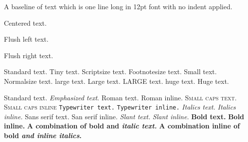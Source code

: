 \usepackage{calc}
\usepackage{longtable}
\usepackage{tabu}
\usepackage{breqn}
\setlength{\arraycolsep}{0.800000em}
\renewcommand{\arraystretch}{1.400000}

\renewcommand{\baselinestretch}{1.250000}
\selectfont
\setlength{\parskip}{1.0\baselineskip}



\noindent
A baseline of text which is one line long in 12pt font with no indent applied.

\begin{center}
Centered text.
\end{center}

\begin{flushleft}
Flush left text.
\end{flushleft}

\begin{flushright}
Flush right text.
\end{flushright}

Standard text. { Tiny text.} { Scriptsize text.} { Footnotesize text.} { Small text.} {\normalsize Normalsize text.} {\large large text.} {\Large Large text.} {\LARGE LARGE text.} {\huge huge text.} {\Huge Huge text.}

Standard text. \emph{Emphasized text}. \textrm{Roman text.} \textrm{Roman inline.} \textsc{Small caps text.} \textsc{Small caps inline} \texttt{Typewriter text.} \texttt{Typewriter inline.} \textit{Italics text.} \textit{Italics inline.} \textsf{Sans serif text.} \textsf{San serif inline.} \textsl{Slant text.} \textsl{Slant inline.}  \textbf{Bold text.} \textbf{Bold inline.} \textbf{A combination of bold and \textit{italic text.}} \textbf{A combination inline of bold \textit{and inline italics}.}

